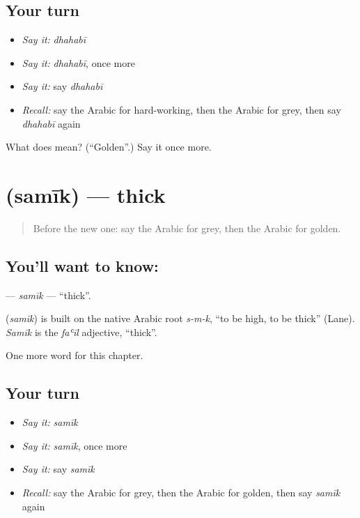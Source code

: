 \subsection*{Your turn}
\begin{itemize}
\raggedright
  \item \emph{Say it:} \emph{dhahabī}
  \item \emph{Say it:} \emph{dhahabī}, once more
  \item \emph{Say it:} say \emph{dhahabī}
  \item \emph{Recall:} say the Arabic for hard-working, then the Arabic for grey, then say \emph{dhahabī} again
\end{itemize}

\begin{tcolorbox}[breakable,colback=teal!4,colframe=teal!35!black,title={Before you move on}]
What does  mean? (\textquotedblleft{}Golden\textquotedblright{}.) Say it once more.
\end{tcolorbox}
\section[\texorpdfstring{\ar{سميك} (samīk)}{سميك (samīk)}]{ (samīk) — thick}

\label{lesson:AR-C179-samik}



\begin{quote}
Before the new one: say the Arabic for grey, then the Arabic for golden.
\end{quote}

\subsection*{You'll want to know: }
\textbf{} — \emph{samīk} — \textquotedblleft{}thick\textquotedblright{}.

\begin{cousinweb}
\textbf{} (\emph{samīk}) is built on the native Arabic root \emph{s-m-k}, \textquotedblleft{}to be high, to be thick\textquotedblright{} (Lane). \emph{Samīk} is the \emph{faʿīl} adjective, \textquotedblleft{}thick\textquotedblright{}.
\end{cousinweb}

\begin{grammarlens}[title={What you've built}]
One more word for this chapter.
\end{grammarlens}

\subsection*{Your turn}
\begin{itemize}
\raggedright
  \item \emph{Say it:} \emph{samīk}
  \item \emph{Say it:} \emph{samīk}, once more
  \item \emph{Say it:} say \emph{samīk}
  \item \emph{Recall:} say the Arabic for grey, then the Arabic for golden, then say \emph{samīk} again
\end{itemize}

